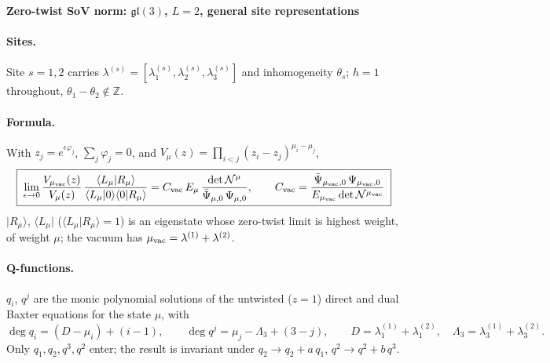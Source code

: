 \documentclass[10pt]{article}
\newcommand{\vac}{{\rm vac}}
\begin{document}
\begin{center}
{\large\bf Zero-twist SoV norm: $\mathfrak{gl}(3)$, $L=2$, general site representations}
\end{center}

\paragraph{Sites.} Site $s=1,2$ carries $\lambda^{(s)}=[\lambda^{(s)}_1,\lambda^{(s)}_2,\lambda^{(s)}_3]$ and inhomogeneity $\theta_s$; $h=1$ throughout, $\theta_1-\theta_2\notin\mathbb Z$.

\paragraph{Formula.} With $z_j=e^{\epsilon\varphi_j}$, $\sum_j\varphi_j=0$, and $V_\mu(z)=\prod_{i<j}(z_i-z_j)^{\mu_i-\mu_j}$,
\begin{equation}
\boxed{\;\lim_{\epsilon\to0}\frac{V_{\mu_\vac}(z)}{V_{\mu}(z)}\,
\frac{\langle L_\mu|R_\mu\rangle}{\langle L_\mu|0\rangle\langle0|R_\mu\rangle}
=C_\vac\,E_{\mu}\,\frac{\det\mathcal N^\mu}{\bar\Psi_{\mu,0}\,\Psi_{\mu,0}},\qquad
C_\vac=\frac{\bar\Psi_{\mu_\vac,0}\,\Psi_{\mu_\vac,0}}{E_{\mu_\vac}\det\mathcal N^{\mu_\vac}}\;}
\end{equation}
$|R_\mu\rangle$, $\langle L_\mu|$ ($\langle L_\mu|R_\mu\rangle=1$) is an eigenstate whose zero-twist limit is highest weight, of weight $\mu$; the vacuum has $\mu_\vac=\lambda^{(1)}+\lambda^{(2)}$.

\paragraph{Q-functions.} $q_i$, $q^j$ are the monic polynomial solutions of the untwisted ($z=1$) direct and dual Baxter equations for the state $\mu$, with
\begin{equation}
\deg q_i=(D-\mu_i)+(i-1),\qquad \deg q^j=\mu_j-\Lambda_3+(3-j),\qquad D=\lambda^{(1)}_1+\lambda^{(2)}_1,\quad \Lambda_3=\lambda^{(1)}_3+\lambda^{(2)}_3 .
\end{equation}
Only $q_1,q_2,q^3,q^2$ enter; the result is invariant under $q_2\to q_2+a\,q_1$, $q^2\to q^2+b\,q^3$.
\end{document}
